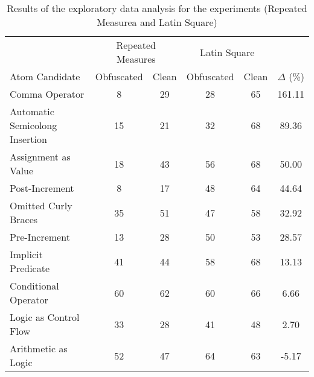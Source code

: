 \begin{table}
  \caption{Results of the exploratory data analysis for the experiments (Repeated Measurea and Latin Square)}
  \label{tab:merge-exploratory-study}
  \begin{scriptsize}
  \begin{tabular}{lccccc} \toprule
                                 & \multicolumn{2}{c}{Repeated Measures} & \multicolumn{2}{c}{Latin Square} & \\  
  Atom Candidate                 &   Obfuscated   &   Clean   &   Obfuscated   &   Clean   &  $\Delta$ (\%)    \\ \midrule
Comma Operator                   &      8         &   29      &       28       &     65    &   161.11  \\
Automatic Semicolong Insertion   &     15         &   21      &       32       &     68    &    89.36  \\
Assignment as Value              &     18         &   43      &       56       &     68    &    50.00  \\
Post-Increment                   &      8         &   17      &       48       &     64    &    44.64  \\
Omitted Curly Braces             &     35         &   51      &       47       &     58    &    32.92  \\
Pre-Increment                    &     13         &   28      &       50       &     53    &    28.57  \\
Implicit Predicate               &     41         &   44      &       58       &     68    &    13.13  \\
Conditional Operator             &     60         &   62      &       60       &     66    &     6.66  \\
Logic as Control Flow            &     33         &   28      &       41       &     48    &     2.70  \\ 
Arithmetic as Logic              &     52         &   47      &       64       &     63    &    -5.17  \\ \bottomrule
  \end{tabular}
\end{scriptsize}  
\end{table}


